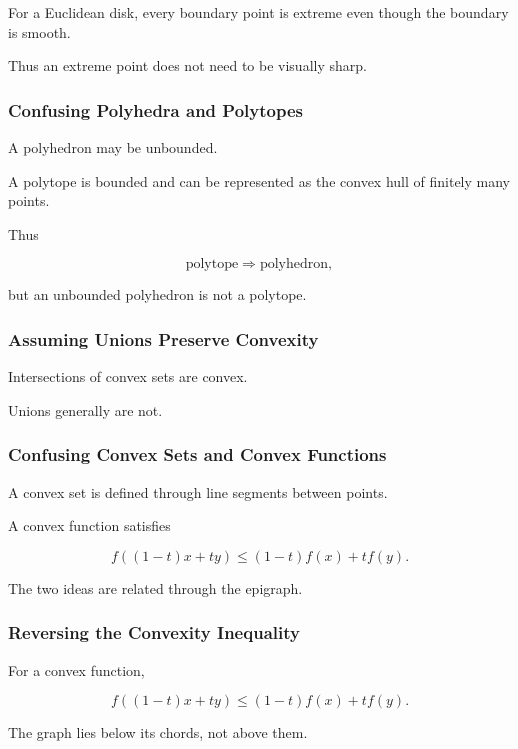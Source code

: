 For a Euclidean disk, every boundary point is extreme even though the
boundary is smooth.

Thus an extreme point does not need to be visually sharp.

\subsubsection{Confusing Polyhedra and Polytopes}

A polyhedron may be unbounded.

A polytope is bounded and can be represented as the convex hull of finitely
many points.

Thus

\[
\boxed{
\text{polytope}
\Longrightarrow
\text{polyhedron},
}
\]

but an unbounded polyhedron is not a polytope.

\subsubsection{Assuming Unions Preserve Convexity}

Intersections of convex sets are convex.

Unions generally are not.

\subsubsection{Confusing Convex Sets and Convex Functions}

A convex set is defined through line segments between points.

A convex function satisfies

\[
f((1-t)x+ty)
\leq
(1-t)f(x)+tf(y).
\]

The two ideas are related through the epigraph.

\subsubsection{Reversing the Convexity Inequality}

For a convex function,

\[
\boxed{
f((1-t)x+ty)
\leq
(1-t)f(x)+tf(y).
}
\]

The graph lies below its chords, not above them.

